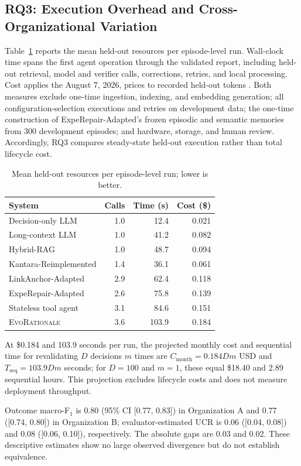 \documentclass[10pt,conference]{IEEEtran}
\begin{document}
\subsection{RQ3: Execution Overhead and Cross-Organizational Variation}
\label{subsec:results-rq3} 
Table~\ref{tab:rq3-efficiency} reports the mean held-out resources per episode-level run. Wall-clock time spans the first agent operation through the validated report, including held-out retrieval, model and verifier calls, corrections, retries, and local processing. Cost applies the August 7, 2026, prices to recorded held-out tokens \cite{OpenAIModels2026}. Both measures exclude one-time ingestion, indexing, and embedding generation; all configuration-selection executions and retries on development data; the one-time construction of ExpeRepair-Adapted's frozen episodic and semantic memories from 300 development episodes; and hardware, storage, and human review. Accordingly, RQ3 compares steady-state held-out execution rather than total lifecycle cost.
\begin{table}[!b]
\caption{Mean held-out resources per episode-level run; lower is better.}
\label{tab:rq3-efficiency}
\centering
\scriptsize
\renewcommand{\arraystretch}{1.03}
\setlength{\tabcolsep}{3pt}
\begin{tabularx}{\columnwidth}{@{}Xrrr@{}}
\toprule
\textbf{System}&\textbf{Calls}&\textbf{Time (s)}&\textbf{Cost (\$)}\\
\midrule
Decision-only LLM&1.0&12.4&0.021\\
Long-context LLM&1.0&41.2&0.082\\
Hybrid-RAG&1.0&48.7&0.094\\
Kantara-Reimplemented&1.4&36.1&0.061\\
LinkAnchor-Adapted&2.9&62.4&0.118\\
ExpeRepair-Adapted&2.6&75.8&0.139\\
Stateless tool agent&3.1&84.6&0.151\\
\textsc{EvoRationale}&3.6&103.9&0.184\\
\bottomrule
\end{tabularx}
\end{table}
At \$0.184 and 103.9 seconds per run, the projected monthly cost and sequential time for revalidating $D$ decisions $m$ times are $C_{\mathrm{month}}=0.184Dm$ USD and $T_{\mathrm{seq}}=103.9Dm$ seconds; for $D=100$ and $m=1$, these equal \$18.40 and 2.89 sequential hours. This projection excludes lifecycle costs and does not measure deployment throughput. \par Outcome macro-F$_1$ is 0.80 (95\% CI [0.77, 0.83]) in Organization A and 0.77 ([0.74, 0.80]) in Organization B; evaluator-estimated UCR is 0.06 ([0.04, 0.08]) and 0.08 ([0.06, 0.10]), respectively. The absolute gaps are 0.03 and 0.02. These descriptive estimates show no large observed divergence but do not establish equivalence.
\end{document}
